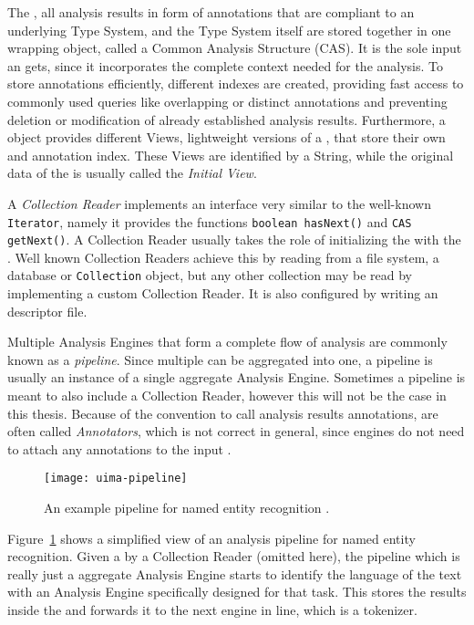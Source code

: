 The \sofa{}, all analysis results in form of annotations that are compliant to an underlying Type System, and the Type System itself are stored together in one wrapping object, called a Common Analysis Structure (CAS). It is the sole input an \anen{} gets, since it incorporates the complete context needed for the analysis. To store annotations efficiently, different indexes are created, providing fast access to commonly used queries like overlapping or distinct annotations and preventing deletion or modification of already established analysis results. Furthermore, a \cas{} object provides different Views, lightweight versions of a \cas{}, that store their own \sofa{} and annotation index. These Views are identified by a String, while the original data of the \cas{} is usually called the \emph{Initial View}. 

A \emph{Collection Reader} implements an interface very similar to the well-known \lstinline|Iterator|, namely it provides the functions \lstinline|boolean hasNext()| and \lstinline|CAS getNext()|. A Collection Reader usually takes the role of initializing the \cas{} with the \sofa{}. Well known Collection Readers achieve this by reading from a file system, a database or \lstinline|Collection| object, but any other collection may be read by implementing a custom Collection Reader. It is also configured by writing an \xml{} descriptor file.

Multiple Analysis Engines that form a complete flow of analysis are commonly known as a \emph{pipeline}. Since multiple \anens{} can be aggregated into one, a pipeline is usually an instance of a single aggregate Analysis Engine. Sometimes a pipeline is meant to also include a Collection Reader, however this will not be the case in this thesis. Because of the convention to call analysis results annotations, \anens{} are often called \emph{Annotators}, which is not correct in general, since engines do not need to attach any annotations to the input \cas{}.

\begin{figure}[hbt]
	\centering
	\texttt{[image: uima-pipeline]}
	\caption[An example UIMA pipeline for NER.]{An example \uima{} pipeline for named entity recognition \cite{uimasdk}.}
	\label{fig:uimaner}
\end{figure}

Figure~\ref{fig:uimaner} shows a simplified view of an analysis pipeline for named entity recognition. Given a \cas{} by a Collection Reader (omitted here), the pipeline which is really just a aggregate Analysis Engine starts to identify the language of the text with an Analysis Engine specifically designed for that task. This \anen{} stores the results inside the \cas{} and forwards it to the next engine in line, which is a tokenizer. 


